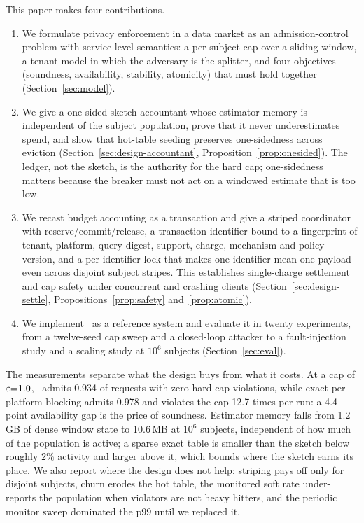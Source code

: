 This paper makes four contributions.
\begin{enumerate}
\item We formulate privacy enforcement in a data market as an admission-control
problem with service-level semantics: a per-subject cap over a sliding window, a
tenant model in which the adversary is the splitter, and four objectives
(soundness, availability, stability, atomicity) that must hold together
(Section~\ref{sec:model}).
\item We give a one-sided sketch accountant whose estimator memory is
independent of the subject population, prove that it never underestimates spend,
and show that hot-table seeding preserves one-sidedness across eviction
(Section~\ref{sec:design-accountant}, Proposition~\ref{prop:onesided}). The
ledger, not the sketch, is the authority for the hard cap; one-sidedness matters
because the breaker must not act on a windowed estimate that is too low.
\item We recast budget accounting as a transaction and give a striped coordinator
with reserve/commit/release, a transaction identifier bound to a fingerprint of
tenant, platform, query digest, support, charge, mechanism and policy version,
and a per-identifier lock that makes one identifier mean one payload even across
disjoint subject stripes. This establishes single-charge settlement and cap safety
under concurrent and crashing clients (Section~\ref{sec:design-settle},
Propositions~\ref{prop:safety} and~\ref{prop:atomic}).
\item We implement \sys\ as a reference system and evaluate it in twenty
experiments, from a twelve-seed cap sweep and a closed-loop attacker to a
fault-injection study and a scaling study at $10^6$ subjects
(Section~\ref{sec:eval}).
\end{enumerate}

The measurements separate what the design buys from what it costs. At a cap of
$\varepsilon{=}1.0$, \sys\ admits 0.934 of requests with zero hard-cap violations, while
exact per-platform blocking admits 0.978 and violates the cap 12.7 times per run: a
4.4-point availability gap is the price of soundness. Estimator memory falls from
1.2\,GB of dense window state to 10.6\,MB at $10^6$ subjects, independent of how
much of the population is active; a sparse exact table is smaller than the sketch
below roughly $2\%$ activity and larger above it, which bounds where the sketch
earns its place. We also report where the design does not help: striping pays off only for
disjoint subjects, churn erodes the hot table, the monitored soft rate under-reports
the population when violators are not heavy hitters, and the periodic monitor sweep
dominated the p99 until we replaced it.
